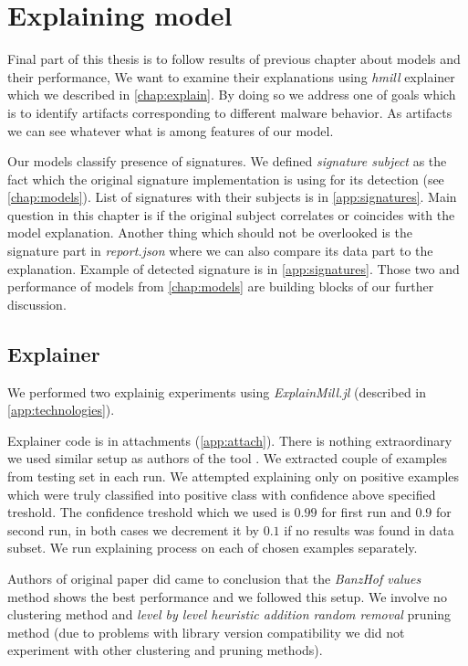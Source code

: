 \chapter{Explaining model} \label{chap:expex}
Final part of this thesis is to follow results of previous chapter about models and their performance, We want to examine their explanations using \emph{hmill} explainer \cite{Pevny2020} which we described in \ref{chap:explain}. By doing so we address one of goals which is to identify artifacts corresponding to different malware behavior. As artifacts we can see whatever what is among features of our model. 

Our models classify presence of signatures. We defined \emph{signature subject} as the fact which the original signature implementation is using for its detection (see \ref{chap:models}). List of signatures with their subjects is in \ref{app:signatures}. Main question in this chapter is if the original subject correlates or coincides with the model explanation. Another thing which should not be overlooked is the signature part in \emph{report.json} where we can also compare its data part to the explanation. Example of detected signature is in \ref{app:signatures}. Those two and performance of models from \ref{chap:models} are building blocks of our further discussion.

\section{Explainer}
We performed two explainig experiments using \emph{ExplainMill.jl} (described in \ref{app:technologies}). 

Explainer code is in attachments (\ref{app:attach}). There is nothing extraordinary we used similar setup as authors of the tool \cite{Pevny2020}. We extracted couple of examples from testing set in each run. We attempted explaining only on positive examples which were truly classified into positive class with confidence above specified treshold. The confidence treshold which we used is $0.99$ for first run and $0.9$ for second run, in both cases we decrement it by $0.1$ if no results was found in data subset. We run explaining process on each of chosen examples separately.

Authors of original paper did came to conclusion that the \emph{BanzHof values} method shows the best performance and we followed this setup. We involve no clustering method and \emph{level by level heuristic addition random removal} pruning method (due to problems with library version compatibility we did not experiment with other clustering and pruning methods). 

